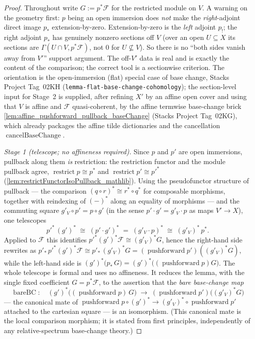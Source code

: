 \begin{proof}\leanok
  Throughout write \(G := p^*\mathcal{F}\) for the restricted module on \(V\). A warning on the
  geometry first: \(p\) being an open immersion does \emph{not} make the \emph{right}-adjoint
  direct image \(p_*\) extension-by-zero. Extension-by-zero is the \emph{left} adjoint \(p_!\);
  the right adjoint \(p_*\) has genuinely nonzero sections off \(V\) (over an open \(U \subseteq
  X\) its sections are \(\Gamma(U \cap V, p^*\mathcal{F})\), not \(0\) for \(U \not\subseteq V\)).
  So there is no ``both sides vanish away from \(V'\)'' support argument. The off-\(V'\) data is
  real and is exactly the content of the comparison; the correct tool is a sectionwise criterion.
  The orientation is the open-immersion (flat) special case of base change, Stacks Project
  Tag~02KH (\texttt{lemma-flat-base-change-cohomology}); the section-level input for Stage~2 is
  supplied, after refining \(X'\) by an affine open cover and using that \(V\) is affine and
  \(\mathcal{F}\) quasi-coherent, by the affine termwise base-change brick
  \cref{lem:affine_pushforward_pullback_baseChange} (Stacks Project Tag~02KG), which already
  packages the affine tilde dictionaries and the cancellation
  \(\operatorname{cancelBaseChange}\).

  \emph{Stage 1 (telescope; no affineness required).} Since \(p\) and \(p'\) are open immersions,
  pullback along them \emph{is} restriction: the restriction functor and the module pullback
  agree, \(\operatorname{restrict} p \cong p^*\) and \(\operatorname{restrict} p' \cong p'^*\)
  (\cref{lem:restrictFunctorIsoPullback_mathlib}). Using the pseudofunctor structure of pullback
  --- the comparison \((q \circ r)^* \cong r^* \circ q^*\) for composable morphisms, together with
  reindexing of \((-)^*\) along an equality of morphisms --- and the commuting square
  \(g'_V \circ p' = p \circ g'\) (in the sense \(p' \cdot g' = g'_V \cdot p\) as maps
  \(V' \to X\)), one telescopes
  \[
    p'^*\,(g')^*
      \;\cong\; (p' \cdot g')^*
      \;=\; (g'_V \cdot p)^*
      \;\cong\; (g'_V)^*\,p^* .
  \]
  Applied to \(\mathcal{F}\) this identifies \(p'^*(g')^*\mathcal{F} \cong (g'_V)^* G\), hence the
  right-hand side rewrites as
  \(p'_*\,p'^*(g')^*\mathcal{F} \cong p'_*\,(g'_V)^* G = (\operatorname{pushforward} p')
  ((g'_V)^* G)\), while the left-hand side is
  \((g')^*\bigl(p_*\,G\bigr) = (g')^*\bigl((\operatorname{pushforward} p) G\bigr)\). The whole
  telescope is formal and uses no affineness. It reduces the lemma, with the single fixed
  coefficient \(G = p^*\mathcal{F}\), to the assertion that the \emph{bare base-change map}
  \[
    \operatorname{bareBC} \colon\quad
    (g')^*\bigl((\operatorname{pushforward} p)\,G\bigr)
      \;\longrightarrow\;
    (\operatorname{pushforward} p')\bigl((g'_V)^* G\bigr)
  \]
  --- the canonical mate of \(\operatorname{pushforward} p \circ (g')^* \to (g'_V)^* \circ
  \operatorname{pushforward} p'\) attached to the cartesian square --- is an isomorphism. (This
  canonical mate is the local comparison morphism; it is stated from first principles,
  independently of any relative-spectrum base-change theory.)


\end{proof}
